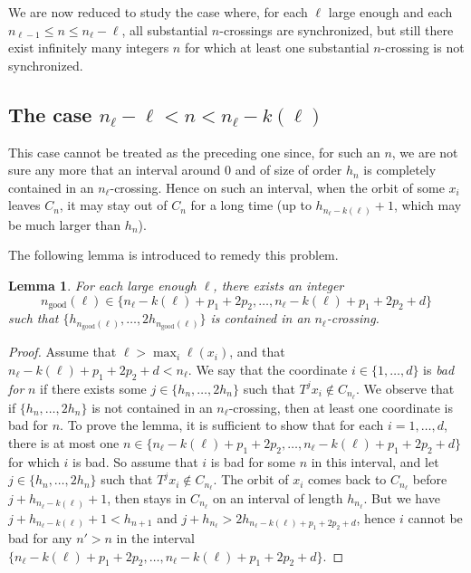 \documentclass[10pt]{amsart}
\newtheorem{lemm}[theo]{Lemma}\newtheorem{prop}[theo]{Proposition}\newtheorem{coro}[theo]{Corollary}\newtheorem{conj}[theo]{Conjecture}
\theoremstyle{definition}\newtheorem{defi}[theo]{Definition}\newtheorem{rema}[theo]{Remark}\newtheorem{exam}[theo]{Example}\newtheorem{exem}[theo]{Example}\newtheorem{nota}[theo]{Notation}
\newcommand{\ngood}{n_{\text{good}}}
\begin{document}

We are now reduced to study the case where, for each $\ell$ large enough and each $n_{\ell-1}\le n \le n_\ell-\ell$, all substantial $n$-crossings are synchronized, but still there exist infinitely many integers $n$ for which at least one substantial $n$-crossing is not synchronized.


\subsection{The case \texorpdfstring{$n_\ell-\ell < n<n_\ell-k(\ell)$}{nl-l < n<nl-k(l)}}\label{sec:moredifficult}

This case cannot be treated as the preceding one since, for such an $n$, we are not sure any more that an interval around 0 and of size of order $h_n$ is completely contained in an $n_\ell$-crossing. Hence on such an interval, when the orbit of some $x_i$ leaves $C_n$, it may stay out of $C_n$ for a long time (up to $h_{n_\ell-k(\ell)}+1$, which may be much larger than $h_n$).

The following lemma is introduced to remedy this problem.
\begin{lemm}\label{lemma:n_good}
For each large enough $\ell$, there exists an integer
\[
\ngood(\ell)\in \{n_\ell - k(\ell)+ p_1+2p_2,\ldots,n_\ell - k(\ell)+ p_1+2p_2+d\}
\]
such that $\{h_{\ngood(\ell)},\ldots,2h_{\ngood(\ell)}\}$ is contained in an $n_\ell$-crossing.
\end{lemm}

\begin{proof}
Assume that $\ell>\max_i \ell(x_i)$, and that $n_\ell - k(\ell)+ p_1+2p_2+d<n_\ell$. We say that the coordinate $i\in\{1,\ldots,d\}$ is \emph{bad for} $n$ if there exists some $j\in \{h_n,\ldots,2h_n\}$ such that $T^j x_i\notin C_{n_\ell}$. We observe that if $\{h_n,\ldots,2h_n\}$ is not contained in an $n_\ell$-crossing, then at least one coordinate is bad for $n$. To prove the lemma, it is sufficient to show that for each $i=1,\ldots,d$, there is at most one $n\in \{n_\ell - k(\ell)+ p_1+2p_2,\ldots,n_\ell - k(\ell)+ p_1+2p_2+d\}$ for which $i$ is bad. So assume that $i$ is bad for some $n$ in this interval, and let $j\in \{h_n,\ldots,2h_n\}$ such that $T^j x_i\notin C_{n_\ell}$. The orbit of $x_i$ comes back to $C_{n_\ell}$ before $j+h_{n_\ell-k(\ell)}+1$, then stays in $C_{n_\ell}$ on an interval of length $h_{n_\ell}$. But we have $j+h_{n_\ell-k(\ell)}+1<h_{n+1}$ and $j+h_{n_\ell}>2 h_{n_\ell - k(\ell)+ p_1+2p_2+d}$, hence $i$ cannot be bad for any $n'>n$ in the interval $\{n_\ell - k(\ell)+ p_1+2p_2,\ldots,n_\ell - k(\ell)+ p_1+2p_2+d\}$.
\end{proof}
\end{document}
